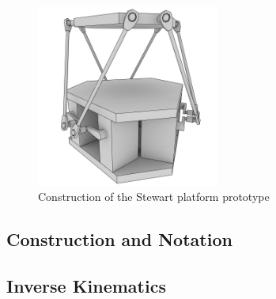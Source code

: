 \begin{figure}[tb]
	\centering
	\includegraphics[width=6cm]{../figures/stewart}
	\caption{Construction of the Stewart platform prototype}
	\label{fig:stewart}
\end{figure}

\subsection{Construction and Notation}

\subsection{Inverse Kinematics}